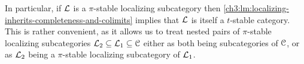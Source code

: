 \begin{remark}
    \label{ch3:rm:pi-stable-implies-t-stable}
    In particular, if $\mathcal{L}$ is a $\pi$-stable localizing subcategory then \cref{ch3:lm:localizing-inherits-completeness-and-colimits} implies that $\mathcal{L}$ is itself a $t$-stable category. This is rather convenient, as it allows us to treat nested pairs of $\pi$-stable localizing subcategories $\mathcal{L}_2 \subseteq \mathcal{L}_1 \subseteq \EuScript{C}$ either as both being subcategories of $\EuScript{C}$, or as $\mathcal{L}_2$ being a $\pi$-stable localizing subcategory of $\mathcal{L}_1$. 
\end{remark}





